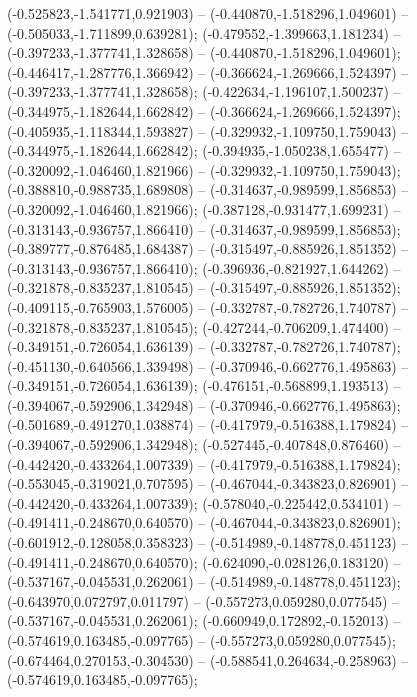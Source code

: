  (-0.525823,-1.541771,0.921903) -- (-0.440870,-1.518296,1.049601) -- (-0.505033,-1.711899,0.639281);
 (-0.479552,-1.399663,1.181234) -- (-0.397233,-1.377741,1.328658) -- (-0.440870,-1.518296,1.049601);
 (-0.446417,-1.287776,1.366942) -- (-0.366624,-1.269666,1.524397) -- (-0.397233,-1.377741,1.328658);
 (-0.422634,-1.196107,1.500237) -- (-0.344975,-1.182644,1.662842) -- (-0.366624,-1.269666,1.524397);
 (-0.405935,-1.118344,1.593827) -- (-0.329932,-1.109750,1.759043) -- (-0.344975,-1.182644,1.662842);
 (-0.394935,-1.050238,1.655477) -- (-0.320092,-1.046460,1.821966) -- (-0.329932,-1.109750,1.759043);
 (-0.388810,-0.988735,1.689808) -- (-0.314637,-0.989599,1.856853) -- (-0.320092,-1.046460,1.821966);
 (-0.387128,-0.931477,1.699231) -- (-0.313143,-0.936757,1.866410) -- (-0.314637,-0.989599,1.856853);
 (-0.389777,-0.876485,1.684387) -- (-0.315497,-0.885926,1.851352) -- (-0.313143,-0.936757,1.866410);
 (-0.396936,-0.821927,1.644262) -- (-0.321878,-0.835237,1.810545) -- (-0.315497,-0.885926,1.851352);
 (-0.409115,-0.765903,1.576005) -- (-0.332787,-0.782726,1.740787) -- (-0.321878,-0.835237,1.810545);
 (-0.427244,-0.706209,1.474400) -- (-0.349151,-0.726054,1.636139) -- (-0.332787,-0.782726,1.740787);
 (-0.451130,-0.640566,1.339498) -- (-0.370946,-0.662776,1.495863) -- (-0.349151,-0.726054,1.636139);
 (-0.476151,-0.568899,1.193513) -- (-0.394067,-0.592906,1.342948) -- (-0.370946,-0.662776,1.495863);
 (-0.501689,-0.491270,1.038874) -- (-0.417979,-0.516388,1.179824) -- (-0.394067,-0.592906,1.342948);
 (-0.527445,-0.407848,0.876460) -- (-0.442420,-0.433264,1.007339) -- (-0.417979,-0.516388,1.179824);
 (-0.553045,-0.319021,0.707595) -- (-0.467044,-0.343823,0.826901) -- (-0.442420,-0.433264,1.007339);
 (-0.578040,-0.225442,0.534101) -- (-0.491411,-0.248670,0.640570) -- (-0.467044,-0.343823,0.826901);
 (-0.601912,-0.128058,0.358323) -- (-0.514989,-0.148778,0.451123) -- (-0.491411,-0.248670,0.640570);
 (-0.624090,-0.028126,0.183120) -- (-0.537167,-0.045531,0.262061) -- (-0.514989,-0.148778,0.451123);
 (-0.643970,0.072797,0.011797) -- (-0.557273,0.059280,0.077545) -- (-0.537167,-0.045531,0.262061);
 (-0.660949,0.172892,-0.152013) -- (-0.574619,0.163485,-0.097765) -- (-0.557273,0.059280,0.077545);
 (-0.674464,0.270153,-0.304530) -- (-0.588541,0.264634,-0.258963) -- (-0.574619,0.163485,-0.097765);
